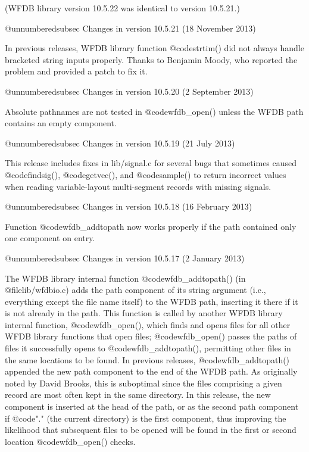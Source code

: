 {{{{{{{{(WFDB library version 10.5.22 was identical to version 10.5.21.)

@unnumberedsubsec Changes in version 10.5.21 (18 November 2013)

In previous releases, WFDB library function @code{strtim()} did not always
handle bracketed string inputs properly.  Thanks to Benjamin Moody,
who reported the problem and provided a patch to fix it.

@unnumberedsubsec Changes in version 10.5.20 (2 September 2013)

Absolute pathnames are not tested in @code{wfdb_open()} unless the WFDB
path contains an empty component.

@unnumberedsubsec Changes in version 10.5.19 (21 July 2013)

This release includes fixes in lib/signal.c for several bugs that sometimes
caused @code{findsig()}, @code{getvec()}, and @code{sample()} to return
incorrect values when reading variable-layout multi-segment records with
missing signals.

@unnumberedsubsec Changes in version 10.5.18 (16 February 2013)

Function @code{wfdb_addtopath} now works properly if the path contained
only one component on entry.

@unnumberedsubsec Changes in version 10.5.17 (2 January 2013)

The WFDB library internal function @code{wfdb_addtopath()} (in
@file{lib/wfdbio.c}) adds the path component of its string argument (i.e.,
everything except the file name itself) to the WFDB path, inserting it there if
it is not already in the path.  This function is called by another WFDB library
internal function, @code{wfdb_open()}, which finds and opens files for all
other WFDB library functions that open files; @code{wfdb_open()} passes the
paths of files it successfully opens to @code{wfdb_addtopath()}, permitting
other files in the same locations to be found.  In previous releases,
@code{wfdb_addtopath()} appended the new path component to the end of the WFDB
path.  As originally noted by David Brooks, this is suboptimal since the files
comprising a given record are most often kept in the same directory.  In this
release, the new component is inserted at the head of the path, or as the
second path component if @code{"."} (the current directory) is the first
component, thus improving the likelihood that subsequent files to be opened
will be found in the first or second location @code{wfdb_open()} checks.

}}}}}}}}
